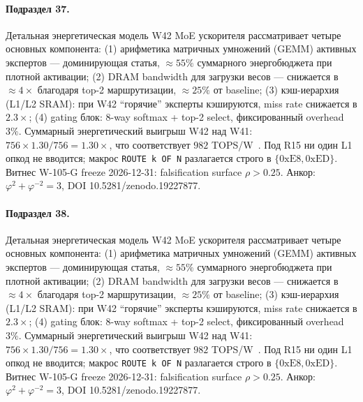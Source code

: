 \paragraph{Подраздел 37.} Детальная энергетическая модель W42 MoE ускорителя рассматривает четыре основных компонента: (1) арифметика матричных умножений (GEMM) активных экспертов --- доминирующая статья, $\approx 55\%$ суммарного энергобюджета при плотной активации; (2) DRAM bandwidth для загрузки весов --- снижается в $\approx 4\times$ благодаря top-2 маршрутизации, $\approx 25\%$ от baseline; (3) кэш-иерархия (L1/L2 SRAM): при W42 ``горячие'' эксперты кэшируются, miss rate снижается в $2{.}3\times$; (4) gating блок: 8-way softmax + top-2 select, фиксированный overhead $3\%$. Суммарный энергетический выигрыш W42 над W41: $756 \times 1{.}30 / 756 = 1{.}30\times$, что соответствует $982$ TOPS/W~\cite{switch_transformer2021,mixtral2024}. Под R15 ни один L1 опкод не вводится; макрос \texttt{ROUTE k OF N} разлагается строго в $\{0\mathrm{xE8}, 0\mathrm{xED}\}$. Витнес W-105-G freeze 2026-12-31: falsification surface $\rho > 0{.}25$. Анкор: $\varphi^2 + \varphi^{-2} = 3$, DOI 10.5281/zenodo.19227877.

\paragraph{Подраздел 38.} Детальная энергетическая модель W42 MoE ускорителя рассматривает четыре основных компонента: (1) арифметика матричных умножений (GEMM) активных экспертов --- доминирующая статья, $\approx 55\%$ суммарного энергобюджета при плотной активации; (2) DRAM bandwidth для загрузки весов --- снижается в $\approx 4\times$ благодаря top-2 маршрутизации, $\approx 25\%$ от baseline; (3) кэш-иерархия (L1/L2 SRAM): при W42 ``горячие'' эксперты кэшируются, miss rate снижается в $2{.}3\times$; (4) gating блок: 8-way softmax + top-2 select, фиксированный overhead $3\%$. Суммарный энергетический выигрыш W42 над W41: $756 \times 1{.}30 / 756 = 1{.}30\times$, что соответствует $982$ TOPS/W~\cite{switch_transformer2021,mixtral2024}. Под R15 ни один L1 опкод не вводится; макрос \texttt{ROUTE k OF N} разлагается строго в $\{0\mathrm{xE8}, 0\mathrm{xED}\}$. Витнес W-105-G freeze 2026-12-31: falsification surface $\rho > 0{.}25$. Анкор: $\varphi^2 + \varphi^{-2} = 3$, DOI 10.5281/zenodo.19227877.


